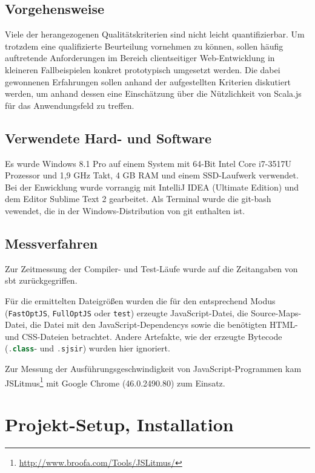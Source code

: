 \documentclass[a4paper, 12pt, hidelinks, listof=totoc, listoftables=totoc, bibliography=totoc]{scrreprt}
\newcommand{\code}[1]{\lstinline[language=Scala, style=inline]|#1|}
\begin{document}
\section{Vorgehensweise}

Viele der herangezogenen Qualitätskriterien sind nicht leicht quantifizierbar. Um trotzdem eine qualifizierte Beurteilung vornehmen zu können, sollen häufig auftretende Anforderungen im Bereich clientseitiger Web-Entwicklung in kleineren Fallbeispielen konkret prototypisch umgesetzt werden. Die dabei gewonnenen Erfahrungen sollen anhand der aufgestellten Kriterien diskutiert werden, um anhand dessen eine Einschätzung über die Nützlichkeit von Scala.js für das Anwendungsfeld zu treffen.


\section{Verwendete Hard- und Software}

Es wurde Windows 8.1 Pro auf einem System mit 64-Bit Intel Core i7-3517U Prozessor und 1,9 GHz Takt, 4 GB RAM und einem SSD-Laufwerk verwendet. Bei der Enwicklung wurde vorrangig mit IntelliJ IDEA (Ultimate Edition) und dem Editor Sublime Text 2 gearbeitet. Als Terminal wurde die git-bash vewendet, die in der Windows-Distribution von git enthalten ist.


\section{Messverfahren}

Zur Zeitmessung der Compiler- und Test-Läufe wurde auf die Zeitangaben von sbt zurückgegriffen.

Für die ermittelten Dateigrößen wurden die für den entsprechend Modus (\code{FastOptJS}, \code{FullOptJS} oder \code{test}) erzeugte JavaScript-Datei, die Source-Maps-Datei, die Datei mit den JavaScript-Dependencys sowie die benötigten \ac{HTML}- und \ac{CSS}-Dateien betrachtet. Andere Artefakte, wie der erzeugte Bytecode (\code{.class}- und \code{.sjsir}) wurden hier ignoriert.

Zur Messung der Ausführungsgeschwindigkeit von JavaScript-Programmen kam JSLitmus\footnote{\url{http://www.broofa.com/Tools/JSLitmus/}} mit Google Chrome (46.0.2490.80) zum Einsatz.



\chapter{Projekt-Setup, Installation}\label{chap:setup}
\end{document}
